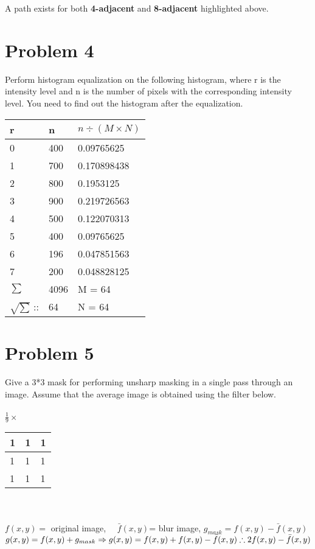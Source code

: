\documentclass[12pt]{article}
\begin{document}
             A path exists for both \textbf{4-adjacent} and \textbf{8-adjacent} highlighted above.
    \section{Problem 4}
    Perform histogram equalization on the following histogram, where r is the intensity level 
    and n is the number of pixels with the corresponding intensity level. You need to find out
     the histogram after the equalization.
        \begin{tabular}{ | l | l | l | }
            \hline
            r & n & ${n} \div (M \times N)$\\\hline
            0 & 400 & 0.09765625\\\hline
            1 & 700 & 0.170898438\\\hline
            2 & 800 & 0.1953125\\\hline
            3 & 900 & 0.219726563\\\hline
            4 & 500 & 0.122070313\\\hline
            5 & 400 & 0.09765625\\\hline
            6 & 196 & 0.047851563\\\hline
            7 & 200 & 0.048828125\\\hline
            \hline        
            $\sum$  & 4096 & M = 64\\\hline
            $\sqrt{\sum}$ :: & 64  & N = 64\\\hline
        \end{tabular}
    \newpage
    \section{Problem 5}
    Give a 3*3 mask for performing unsharp masking in a single pass through an image.
    Assume that the average image is obtained using the filter below.
    \\
    \\
    $\frac{1}{9} \times$  \begin{tabular}{ | l | l | l | }
        \hline
        1 & 1 & 1\\\hline
        1 & 1 & 1\\\hline
        1 & 1 & 1\\\hline
    \end{tabular}
    \\
    \\
    $f(x,y)=$ original image, \ \ $\bar{f}(x,y)$= blur image, 
    $g_{mask}=f(x,y)-\bar{f}(x,y)$\\
    $g(x,y)= f(x,y)+g_{mask} \Rightarrow g(x,y)= f(x,y)+f(x,y)-\bar{f}(x,y)\\
    \therefore 2f(x,y)-\bar{f}(x,y) $ \\
    
\end{document}
